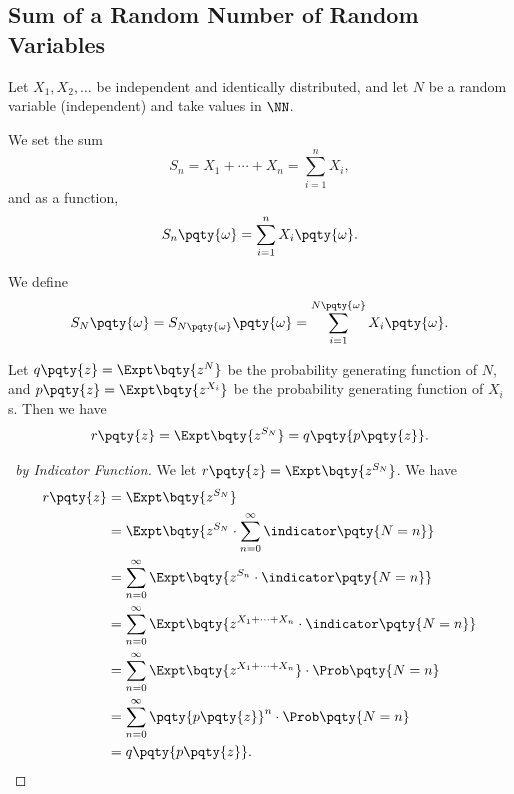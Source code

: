 \subsection{Sum of a Random Number of Random Variables}

Let \(X_1, X_2, \ldots\) be independent and identically distributed, and let \(N\) be a random variable (independent) and take values in \(\NN\).

We set the sum
\[
    S_n = X_1 + \cdots + X_n = \sum_{i = 1}^{n} X_i,
\]
and as a function,
\[
    S_n\pqty{\omega} = \sum_{i = 1}^{n} X_i\pqty{\omega}.
\]

\begin{definition}
    \label{def:sum-random-number-rvs}%
    We define
    \[
        S_N \pqty{\omega} = S_{N\pqty{\omega}} \pqty{\omega} = \sum_{i = 1}^{N\pqty{\omega}} X_i\pqty{\omega}.
    \]
\end{definition}

\begin{lemma}
    \label{lem:pgf-sum}%
    Let \(q\pqty{z} = \Expt\bqty{z^N}\) be the probability generating function of \(N\), and \(p\pqty{z} = \Expt\bqty{z^{X_i}}\) be the probability generating function of \(X_i\)s. Then we have
    \[
        r\pqty{z} = \Expt\bqty{z^{S_N}} = q\pqty{p\pqty{z}}.
    \]
\end{lemma}

\begin{proof}[\proofname\ by Indicator Function]
    We let \(r\pqty{z} = \Expt\bqty{z^{S_N}}\). We have
    \begin{align*}
        r\pqty{z} &= \Expt\bqty{z^{S_N}} \\
        &= \Expt\bqty{z^{S_N} \cdot \sum_{n = 0}^{\infty}  \indicator\pqty{N = n}} \\
        &= \sum_{n = 0}^{\infty} \Expt\bqty{z^{S_n} \cdot \indicator \pqty{N = n}} \\
        &= \sum_{n = 0}^{\infty} \Expt\bqty{z^{X_1 + \cdots + X_n} \cdot \indicator\pqty{N = n}} \\
        &= \sum_{n = 0}^{\infty} \Expt\bqty{z^{X_1 + \cdots + X_n}} \cdot \Prob\pqty{N = n} \\
        &= \sum_{n = 0}^{\infty} \pqty{p\pqty{z}}^{n} \cdot \Prob\pqty{N = n} \\
        &= q\pqty{p\pqty{z}}.
    \end{align*}
\end{proof}

